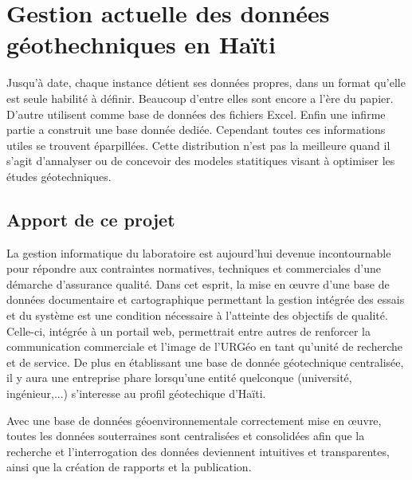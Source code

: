     \section{Gestion actuelle des données géothechniques en Haïti}
    Jusqu’à date, chaque instance détient ses données propres, dans un format qu’elle est seule habilité à définir. Beaucoup d’entre elles sont encore a l’ère du papier. D’autre utilisent comme base de données des fichiers Excel. Enfin une infirme partie a construit une base donnée dediée. Cependant toutes ces informations utiles  se trouvent éparpillées. Cette distribution n’est pas la meilleure quand il s’agit d’annalyser ou de concevoir des modeles statitiques  visant à optimiser les études géotechniques.

    \subsection{Apport de ce projet}
    La gestion informatique du laboratoire est aujourd’hui devenue incontournable pour répondre aux contraintes normatives, techniques et commerciales d’une démarche d’assurance qualité. Dans cet esprit, la mise en œuvre d’une base de données documentaire et cartographique permettant la gestion intégrée des essais et du système est une condition nécessaire à l’atteinte des objectifs de qualité. Celle-ci, intégrée à un portail web, permettrait entre autres de renforcer la communication commerciale et l’image de l’URGéo en tant qu’unité de recherche et de service.
De plus en établissant une base de donnée géotechnique centralisée, il y aura une entreprise phare lorsqu’une entité quelconque (université, ingénieur,...) s’interesse au profil géotechique d’Haïti.
 \par 
    Avec une base de données géoenvironnementale correctement mise en œuvre, 
    toutes les données souterraines sont centralisées et consolidées afin que 
    la recherche et l'interrogation des données deviennent intuitives et 
    transparentes, ainsi que la création de rapports et la publication.
